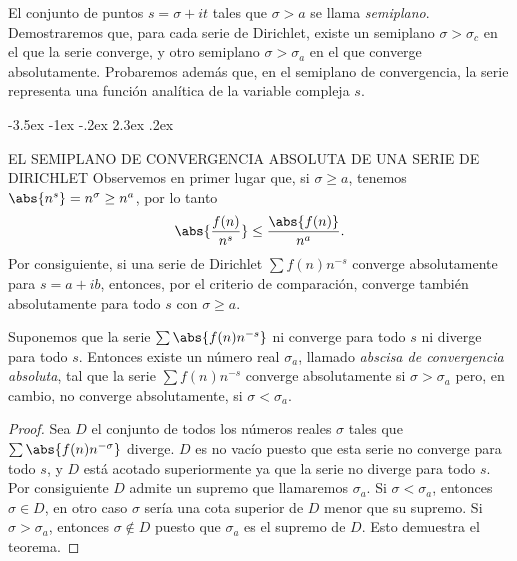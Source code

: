 \documentclass[12pt,a4paper]{book}
\makeatletter
\renewcommand\section{\@startsection{section}{1}{\z@}%
  {-3.5ex \@plus -1ex \@minus -.2ex}%
  {2.3ex \@plus .2ex}%
  {\normalfont\Large\bfseries\raggedright}}
\makeatother
\begin{document}
    El conjunto de puntos $s=\sigma+it$ tales que $\sigma>a$ se llama \textit{semiplano}.
    Demostraremos que, para cada serie de Dirichlet, existe un semiplano $\sigma>\sigma_{c}$
    en el que la serie converge, y otro semiplano $\sigma>\sigma_{a}$ en el que converge
    absolutamente. Probaremos además que, en el semiplano de convergencia, la serie
    representa una función analítica de la variable compleja $s$.

    \section{EL SEMIPLANO DE CONVERGENCIA ABSOLUTA DE UNA SERIE DE DIRICHLET}\label{sim:siga}
    Observemos en primer lugar que, si $\sigma\geq a$, tenemos $\abs{n^{s}}=n^{\sigma}\geq n^{a}$,
    por lo tanto
    \begin{equation*}
        \abs{\frac{f(n)}{n^{s}}}\leq\frac{\abs{f(n)}}{n^{a}}.
    \end{equation*}
    Por consiguiente, si una serie de Dirichlet $\sum f(n)n^{-s}$ converge absolutamente para
    $s=a+ib$, entonces, por el criterio de comparación, converge también absolutamente para
    todo $s$ con $\sigma\geq a$.

    \begin{teorema}\label{teo:11-1}
        Suponemos que la serie $\sum\abs{f(n)n^{-s}}$ ni converge para todo $s$ ni diverge
        para todo $s$. Entonces existe un número real $\sigma_{a}$, llamado \textit{abscisa de
        convergencia absoluta}, tal que la serie $\sum f(n)n^{-s}$ converge absolutamente si
        $\sigma>\sigma_{a}$ pero, en cambio, no converge absolutamente, si $\sigma<\sigma_{a}$.
    \end{teorema}

    \begin{proof}
        Sea $D$ el conjunto de todos los números reales $\sigma$ tales que
        $\sum\abs{f(n)n^{-\sigma}}$ diverge. $D$ es no vacío puesto que esta serie no converge
        para todo $s$, y $D$ está acotado superiormente ya que la serie no diverge para todo
        $s$. Por consiguiente $D$ admite un supremo que llamaremos $\sigma_{a}$. Si
        $\sigma<\sigma_{a}$, entonces $\sigma\in D$, en otro caso $\sigma$ sería una cota
        superior de $D$ menor que su supremo. Si $\sigma>\sigma_{a}$, entonces $\sigma\notin D$
        puesto que $\sigma_{a}$ es el supremo de $D$. Esto demuestra el teorema.
    \end{proof}
\end{document}
